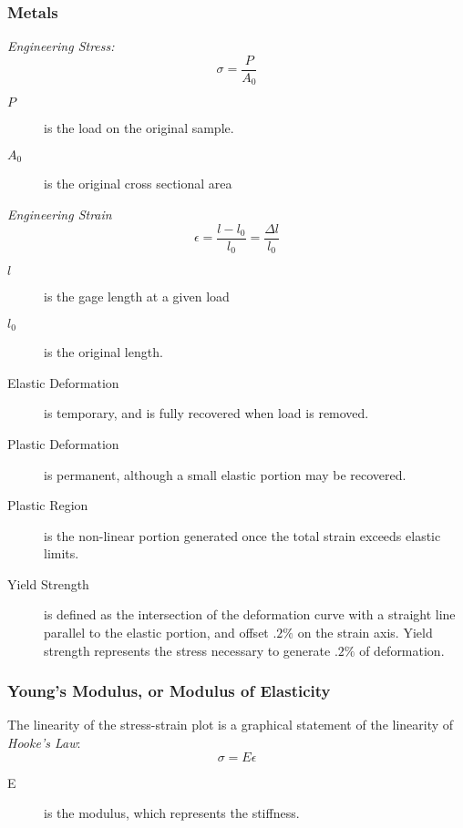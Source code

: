 \documentclass[10pt,letterpaper]{article}
\begin{document}
	\subsubsection*{Metals}
	\emph{Engineering Stress:}
	$$
	\sigma = \frac{P}{A_0}
	$$
	\begin{description}
		\item[$P$] is the load on the original sample.
		\item[$A_0$] is the original cross sectional area
	\end{description}
	
	\emph{Engineering Strain}
	$$
	\epsilon = \frac{l - l_0}{l_0} = \frac{\Delta l}{l_0}
	$$
	\begin{description}
		\item[$l$] is the gage length at a given load
		\item[$l_0$] is the original length. 
	\end{description}
	
	\begin{description}
		\item[Elastic Deformation] is temporary, and is fully recovered when load is removed.
		\item[Plastic Deformation] is permanent, although a small elastic portion may be recovered.
		\item[Plastic Region] is the non-linear portion generated once the total strain exceeds elastic limits.  
		\item[Yield Strength] is defined as the intersection of the deformation curve with a straight line parallel to the elastic portion, and offset $.2\%$ on the strain axis. Yield strength represents the stress necessary to generate $.2\%$ of deformation.
	\end{description}


	\subsubsection*{Young's Modulus, or Modulus of Elasticity}
	The linearity of the stress-strain plot is a graphical statement of the linearity of \textit{Hooke's Law}:
	$$
	\sigma = E \epsilon
	$$
	\begin{description}
		\item[E] is the modulus, which represents the stiffness. 
	\end{description}
	
\end{document}
